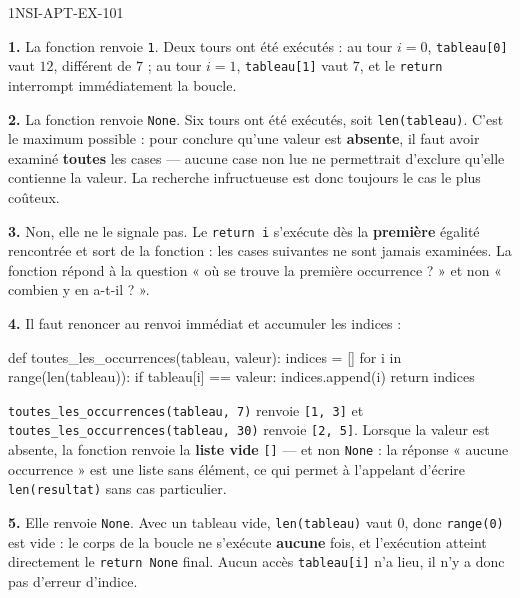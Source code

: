 \begin{corrige}{1NSI-APT-EX-101}

\textbf{1.} La fonction renvoie \lstinline{1}. Deux tours ont été exécutés : au tour
$i=0$, \lstinline{tableau[0]} vaut $12$, différent de $7$ ; au tour $i=1$,
\lstinline{tableau[1]} vaut $7$, et le \lstinline{return} interrompt immédiatement la
boucle.

\textbf{2.} La fonction renvoie \lstinline{None}. Six tours ont été exécutés, soit
\lstinline{len(tableau)}. C'est le maximum possible : pour conclure qu'une valeur est
\textbf{absente}, il faut avoir examiné \textbf{toutes} les cases — aucune case non lue ne
permettrait d'exclure qu'elle contienne la valeur. La recherche infructueuse est donc
toujours le cas le plus coûteux.

\textbf{3.} Non, elle ne le signale pas. Le \lstinline{return i} s'exécute dès la
\textbf{première} égalité rencontrée et sort de la fonction : les cases suivantes ne sont
jamais examinées. La fonction répond à la question « où se trouve la première occurrence ? »
et non « combien y en a-t-il ? ».

\textbf{4.} Il faut renoncer au renvoi immédiat et accumuler les indices :
\begin{python}
def toutes_les_occurrences(tableau, valeur):
    indices = []
    for i in range(len(tableau)):
        if tableau[i] == valeur:
            indices.append(i)
    return indices
\end{python}
\lstinline{toutes_les_occurrences(tableau, 7)} renvoie \lstinline{[1, 3]} et
\lstinline{toutes_les_occurrences(tableau, 30)} renvoie \lstinline{[2, 5]}. Lorsque la
valeur est absente, la fonction renvoie la \textbf{liste vide} \lstinline{[]} — et non
\lstinline{None} : la réponse « aucune occurrence » est une liste sans élément, ce qui
permet à l'appelant d'écrire \lstinline{len(resultat)} sans cas particulier.

\textbf{5.} Elle renvoie \lstinline{None}. Avec un tableau vide, \lstinline{len(tableau)}
vaut $0$, donc \lstinline{range(0)} est vide : le corps de la boucle ne s'exécute
\textbf{aucune} fois, et l'exécution atteint directement le \lstinline{return None} final.
Aucun accès \lstinline{tableau[i]} n'a lieu, il n'y a donc pas d'erreur d'indice.

\end{corrige}

